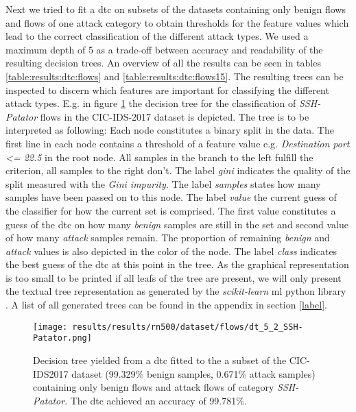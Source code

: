 Next we tried to fit a \gls{dtc} on subsets of the datasets containing only benign flows and flows of one attack category to obtain thresholds for the feature values which lead to the correct classification of the different attack types. We used a maximum depth of 5 as a trade-off between accuracy and readability of the resulting decision trees. An overview of all the results can be seen in tables \ref{table:results:dtc:flows} and \ref{table:results:dtc:flows15}. The resulting trees can be inspected to discern which features are important for classifying the different attack types. E.g. in figure \ref{fig:results:dtc:cic2017:ssh_patator} the decision tree for the classification of \textit{SSH-Patator} flows in the CIC-IDS-2017 dataset is depicted. The tree is to be interpreted as following: Each node constitutes a binary split in the data. The first line in each node contains a threshold of a feature value e.g. \textit{Destination port <= 22.5} in the root node. All samples in the branch to the left fulfill the criterion, all samples to the right don't. The label \textit{gini} indicates the quality of the split measured with the \textit{Gini impurity}. The label \textit{samples} states how many samples have been passed on to this node. The label \textit{value} the current guess of the classifier for how the current set is comprised. The first value constitutes a guess of the \gls{dtc} on how many \textit{benign} samples are still in the set and second value of how many \textit{attack} samples remain. The proportion of remaining \textit{benign} and \textit{attack} values is also depicted in the color of the node. The label \textit{class} indicates the best guess of the \gls{dtc} at this point in the tree. As the graphical representation is too small to be printed if all leafs of the tree are present, we will only present the textual tree representation as generated by the \textit{scikit-learn} \gls{ml} python library \cite{sklearn}. A list of all generated trees can be found in the appendix in section \ref{label}.

\begin{figure}[!htbp]
	\centering
	\texttt{[image: results/results/rn500/dataset/flows/dt\_5\_2\_SSH-Patator.png]}
	\caption{Decision tree yielded from a \gls{dtc} fitted to the a subset of the CIC-IDS2017 dataset (99.329\% benign samples, 0.671\% attack samples) containing only benign flows and attack flows of category \textit{SSH-Patator}. The \gls{dtc} achieved an accuracy of 99.781\%.}
	\label{fig:results:dtc:cic2017:ssh_patator}
\end{figure}





\newpage
